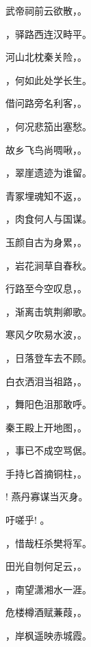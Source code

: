 \documentclass[12pt, a4paper, addpoints, answers]{exam}
\begin{document}
\begin{questions}
\question[3] 武帝祠前云欲散，。

\question[3] ，驿路西连汉畤平。

\question[3] 河山北枕秦关险，。

\question[3] ，何如此处学长生。

\question[3] 借问路旁名利客，。

\question[3] ，何况悲笳出塞愁。

\question[3] 故乡飞鸟尚啁啾，。

\question[3] ，翠崖遗迹为谁留。

\question[3] 青冢埋魂知不返，。

\question[3] ，肉食何人与国谋。

\question[3] 玉颜自古为身累，。

\question[3] ，岩花涧草自春秋。

\question[3] 行路至今空叹息，。

\question[3] ，渐离击筑荆卿歌。

\question[3] 寒风夕吹易水波，。

\question[3] ，日落登车去不顾。

\question[3] 白衣洒泪当祖路，。

\question[3] ，舞阳色沮那敢呼。

\question[3] 秦王殿上开地图，。

\question[3] ，事已不成空骂倨。

\question[3] 手持匕首摘铜柱，。

\question[3] ! 燕丹寡谋当灭身。

\question[3] 吁嗟乎! 。

\question[3] ，惜哉枉杀樊将军。

\question[3] 田光自刎何足云，。

\question[3] ，南望潇湘水一涯。

\question[3] 危楼樽酒赋蒹葭，。

\question[3] ，岸枫遥映赤城霞。


\end{questions}
\end{document}
